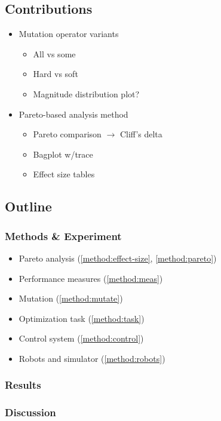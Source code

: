 \documentclass[sigconf, anonymous=false]{acmart}
\begin{document}
\subsection{Contributions}
\begin{itemize}
\item Mutation operator variants
\begin{itemize}
\item All vs some
\item Hard vs soft
\item Magnitude distribution plot?
\end{itemize}
\item Pareto-based analysis method
\begin{itemize}
\item Pareto comparison $\rightarrow$ Cliff's delta
\item Bagplot w/trace
\item Effect size tables
\end{itemize}
\end{itemize}

\newpage
\subsection{Outline}
\subsubsection*{Methods \& Experiment}

\begin{itemize}
\item Pareto analysis (\autoref{method:effect-size}, \autoref{method:pareto})
\item Performance measures (\autoref{method:meas})
\item Mutation (\autoref{method:mutate})
\item Optimization task (\autoref{method:task})
\item Control system (\autoref{method:control})
\item Robots and simulator (\autoref{method:robots})
\end{itemize}

\subsubsection*{Results}
\subsubsection*{Discussion}
\end{document}

